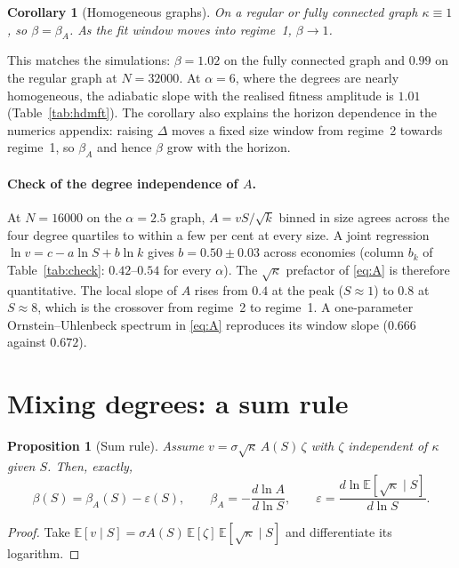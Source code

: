 \documentclass[11pt]{article}
\newcommand{\E}{\mathbb E}
\newtheorem{proposition}{Proposition}
\newtheorem{corollary}{Corollary}
\theoremstyle{remark}
\begin{document}
\begin{corollary}[Homogeneous graphs]\label{cor:homog}
On a regular or fully connected graph $\kappa\equiv1$, so $\beta=\beta_A$.  As the fit window
moves into regime~1, $\beta\to1$.
\end{corollary}
This matches the simulations: $\beta=1.02$ on the fully connected graph and $0.99$ on the
regular graph at $N=32000$.  At $\alpha=6$, where the degrees are nearly homogeneous, the
adiabatic slope with the realised fitness amplitude is $1.01$ (Table~\ref{tab:hdmft}).  The corollary also
explains the horizon dependence in the numerics appendix: raising $\Delta$ moves a fixed size
window from regime~2 towards regime~1, so $\beta_A$ and hence $\beta$ grow with the horizon.

\paragraph{Check of the degree independence of $A$.}
At $N=16000$ on the $\alpha=2.5$ graph, $A=v S/\sqrt k$ binned in size agrees across the four
degree quartiles to within a few per cent at every size.  A joint regression
$\ln v=c-a\ln S+b\ln k$ gives $b=0.50\pm0.03$ across economies (column $b_k$ of
Table~\ref{tab:check}: $0.42$--$0.54$ for every $\alpha$).  The $\sqrt\kappa$ prefactor of
\eqref{eq:A} is therefore quantitative.  The local slope of $A$ rises from $0.4$ at the peak
($S\approx1$) to $0.8$ at $S\approx8$, which is the crossover from regime~2 to regime~1.  A
one-parameter Ornstein--Uhlenbeck spectrum in \eqref{eq:A} reproduces its window slope ($0.666$
against $0.672$).

\section{Mixing degrees: a sum rule}

\begin{proposition}[Sum rule]\label{prop:sum}
Assume $v=\sigma\sqrt\kappa\,A(S)\,\zeta$ with $\zeta$ independent of $\kappa$ given $S$.  Then,
exactly,
\begin{equation}
  \beta(S)=\beta_A(S)-\varepsilon(S),
  \qquad
  \beta_A=-\frac{d\ln A}{d\ln S},
  \qquad
  \varepsilon=\frac{d\ln\E[\sqrt\kappa\mid S]}{d\ln S}.
  \label{eq:sum}
\end{equation}
\end{proposition}

\begin{proof}
Take $\E[v\mid S]=\sigma A(S)\,\E[\zeta]\,\E[\sqrt\kappa\mid S]$ and differentiate its logarithm.
\end{proof}
\end{document}

